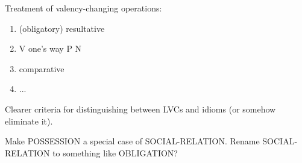 \documentclass[a4paper]{article}
\begin{document}
Treatment of valency-changing operations:

\begin{enumerate}
    \item (obligatory) resultative
    \item V one's way P N
    \item comparative
    \item ...
\end{enumerate}

Clearer criteria for distinguishing between LVCs and idioms (or somehow eliminate it).

Make POSSESSION a special case of SOCIAL-RELATION. Rename SOCIAL-RELATION to
something like OBLIGATION?



\end{document}
